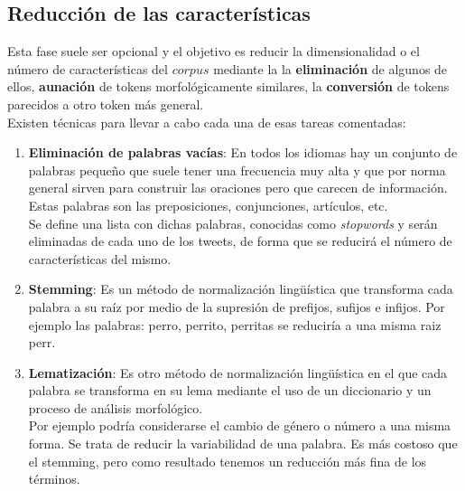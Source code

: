 \documentclass[a4paper,12pt]{report}
\begin{document}
\vspace{4mm}
\subsection{Reducción de las características}

{\setlength{\parindent}{0cm}
Esta fase suele ser opcional y el objetivo es reducir la dimensionalidad o el número de características del $corpus$ mediante la la \textbf{eliminación} de algunos de ellos, \textbf{aunación} de tokens morfológicamente similares, la \textbf{conversión} de tokens parecidos a otro token más general.}
\vspace{2mm}\\
Existen técnicas para llevar a cabo cada una de esas tareas comentadas:

\begin{enumerate}

\item \textbf{Eliminación de palabras vacías}: En todos los idiomas hay un conjunto de palabras pequeño que suele tener una frecuencia muy alta y que por norma general sirven para construir las oraciones pero que carecen de información. Estas palabras son las preposiciones, conjunciones, artículos, etc. 
\vspace{2mm}\\
Se define una lista con dichas palabras, conocidas como \textit{stopwords} y serán eliminadas de cada uno de los tweets, de forma que se reducirá el número de características del mismo. 

\item \textbf{Stemming}: Es un método de normalización lingüística que transforma cada palabra a su raíz por medio de la supresión de prefijos, sufijos e infijos. Por ejemplo las palabras: perro, perrito, perritas se reduciría a una misma raiz perr.


\item \textbf{Lematización}: Es otro método de normalización lingüística en el que cada palabra se transforma en su lema mediante el uso de un diccionario y un proceso de análisis morfológico. 
\vspace{2mm}\\
Por ejemplo podría considerarse el cambio de género o número a una misma forma. Se trata de reducir la variabilidad de una palabra. Es más costoso que el stemming, pero como resultado tenemos un reducción más fina de los términos. 

\end{enumerate}
\end{document}
